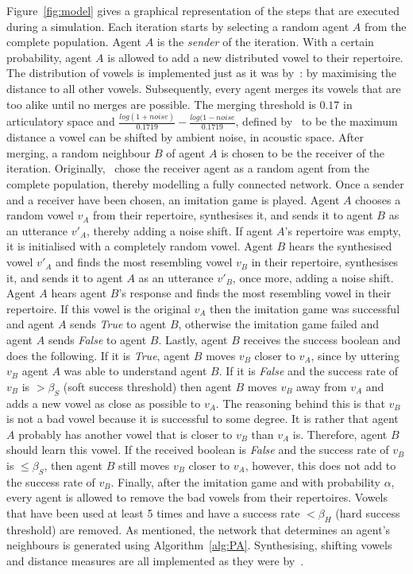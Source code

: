 \documentclass{article}
\begin{document}
Figure~\ref{fig:model} gives a graphical representation of the steps that are executed during a simulation. Each
iteration starts by selecting a random agent $A$ from the complete population. Agent $A$ is the \textit{sender} of the
iteration. With a certain probability, agent $A$ is allowed to add a new distributed vowel to their repertoire.
The distribution of vowels is implemented just as it was by~: by
maximising the distance to all other vowels. Subsequently, every agent merges its vowels that are too alike until no merges
are possible. The merging threshold is $0.17$ in articulatory space and $\frac{log(1+noise)}{0.1719} - \frac{log(1-noise}{0.1719}$,
defined by~ to be the maximum distance
a vowel can be shifted by ambient noise, in acoustic space.
After merging, a random neighbour $B$ of agent $A$ is chosen to be the receiver of the iteration.
Originally,~ chose the receiver agent as a random agent from the
complete population, thereby modelling a fully connected network. Once a sender and a receiver have been chosen, an
imitation game is played. Agent $A$ chooses a random vowel $v_A$ from their repertoire, synthesises it, and sends it to
agent $B$ as an utterance $v'_A$, thereby adding a noise shift. If agent $A$'s repertoire was empty, it is
initialised with a completely random vowel. Agent $B$ hears the synthesised vowel $v'_A$ and finds the most resembling
vowel $v_B$ in their repertoire, synthesises it, and sends it to agent $A$ as an utterance $v'_B$, once more, adding a
noise shift. Agent $A$ hears agent $B$'s response and finds the most resembling vowel in their repertoire. If
this vowel is the original $v_A$ then the imitation game was successful and agent $A$ sends \textit{True} to agent $B$,
otherwise the imitation game failed and agent $A$ sends \textit{False} to agent $B$. Lastly, agent $B$ receives the
success boolean and does the following. If it is \textit{True}, agent $B$ moves $v_B$ closer to $v_A$, since by
uttering $v_B$ agent $A$ was able to understand agent $B$. If it is \textit{False} and the success rate of $v_B$ is $>\beta_S$ (soft success threshold)
then agent $B$ moves $v_B$ away from $v_A$ and adds a new vowel as close as possible to $v_A$. The reasoning
behind this is that $v_B$ is not a bad vowel because it is successful to some degree. It is rather that
agent $A$ probably has another vowel that is closer to $v_B$ than $v_A$ is. Therefore, agent $B$ should learn this
vowel. If the received boolean is \textit{False} and the success rate of $v_B$ is $\leq \beta_S$, then agent $B$ still
moves $v_B$ closer to $v_A$, however, this does not add to the success rate of $v_B$. Finally, after the imitation game
and with probability $\alpha$, every agent is allowed to remove the bad vowels from their repertoires.
Vowels that have been used at least 5 times and have a success rate $< \beta_H$ (hard success threshold) are removed. As mentioned, the network
that determines an agent's neighbours is generated using Algorithm~\ref{alg:PA}. Synthesising, shifting vowels and
distance measures are all implemented as they were by~.
\end{document}
